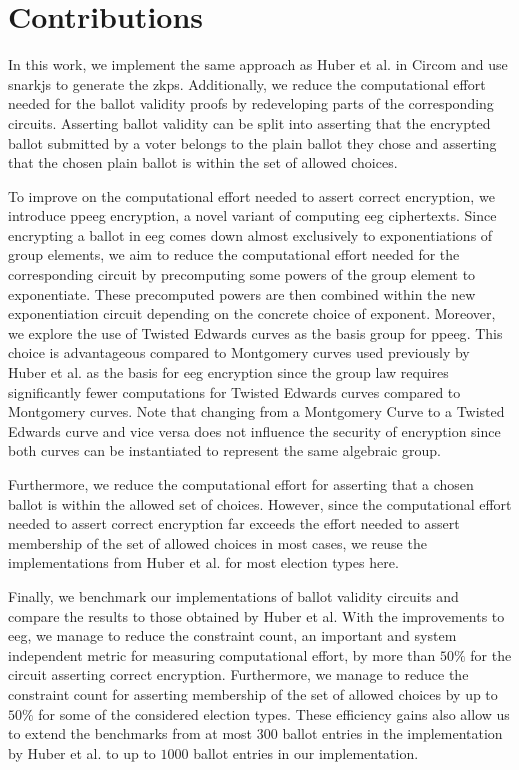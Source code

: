 \section*{Contributions}
In this work, we implement the same approach as Huber et al. in Circom and use snarkjs to generate the \glspl{zkp}.
Additionally, we reduce the computational effort needed for the ballot validity proofs by redeveloping parts of the corresponding circuits.
Asserting ballot validity can be split into asserting that the encrypted ballot submitted by a voter belongs to the plain ballot they chose and asserting that the chosen plain ballot is within the set of allowed choices.

To improve on the computational effort needed to assert correct encryption, we introduce \gls{ppeeg} encryption, a novel variant of computing \gls{eeg} ciphertexts.
Since encrypting a ballot in \gls{eeg} comes down almost exclusively to exponentiations of group elements, we aim to reduce the computational effort needed for the corresponding circuit by precomputing some powers of the group element to exponentiate.
These precomputed powers are then combined within the new exponentiation circuit depending on the concrete choice of exponent.
Moreover, we explore the use of Twisted Edwards curves as the basis group for \gls{ppeeg}.
This choice is advantageous compared to Montgomery curves used previously by Huber et al. as the basis for \gls{eeg} encryption since the group law requires significantly fewer computations for Twisted Edwards curves compared to Montgomery curves.
Note that changing from a Montgomery Curve to a Twisted Edwards curve and vice versa does not influence the security of encryption since both curves can be instantiated to represent the same algebraic group.

Furthermore, we reduce the computational effort for asserting that a chosen ballot is within the allowed set of choices.
However, since the computational effort needed to assert correct encryption far exceeds the effort needed to assert membership of the set of allowed choices in most cases, we reuse the implementations from Huber et al. for most election types here.

Finally, we benchmark our implementations of ballot validity circuits and compare the results to those obtained by Huber et al.
With the improvements to \gls{eeg}, we manage to reduce the constraint count, an important and system independent metric for measuring computational effort, by more than $50\%$ for the circuit asserting correct encryption.
Furthermore, we manage to reduce the constraint count for asserting membership of the set of allowed choices by up to $50\%$ for some of the considered election types.
These efficiency gains also allow us to extend the benchmarks from at most $300$ ballot entries in the implementation by Huber et al. \cite{huber_zk-snarks_2025} to up to $1000$ ballot entries in our implementation.

